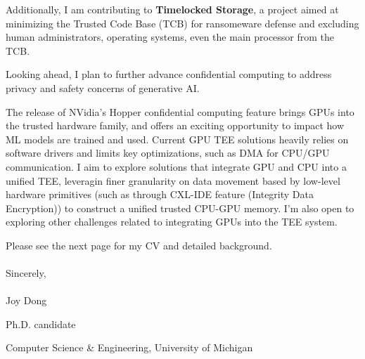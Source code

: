 Additionally, I am contributing to \textbf{Timelocked Storage}, a project aimed at minimizing the Trusted Code Base (TCB) for ransomeware defense and excluding human administrators, operating systems, even the main processor from the TCB. \par

\vspace{3ex}
Looking ahead, I plan to further advance confidential computing to address privacy and safety concerns of generative AI.  \par
The release of NVidia's Hopper confidential computing feature brings GPUs into the trusted hardware family, and offers an exciting opportunity to impact how ML models are trained and used. Current GPU TEE solutions heavily relies on software drivers and limits key optimizations, such as DMA for CPU/GPU communication. I aim to explore solutions that integrate GPU and CPU into a unified TEE, leveragin finer granularity on data movement based by low-level hardware primitives (such as through CXL-IDE feature (Integrity Data Encryption)) to construct a unified trusted CPU-GPU memory. I'm also open to exploring other challenges related to integrating GPUs into the TEE system. \\

\vspace{3ex}

Please see the next page for my CV and detailed background. \\
\vspace{3ex}
\paragraph*{}
\:\: Sincerely, 
\paragraph*{}
\:\: Joy Dong \par
Ph.D. candidate\par
Computer Science \& Engineering, University of Michigan

